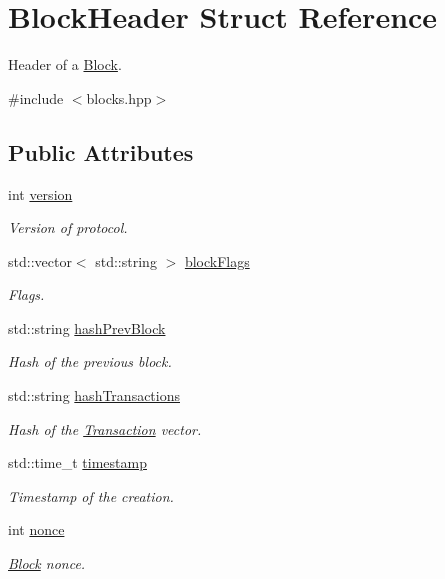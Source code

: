 \hypertarget{structBlockHeader}{}\section{Block\+Header Struct Reference}
\label{structBlockHeader}


Header of a \mbox{\hyperlink{classBlock}{Block}}.  




{\ttfamily \#include $<$blocks.\+hpp$>$}

\subsection*{Public Attributes}
\begin{DoxyCompactItemize}
\item 
int \mbox{\hyperlink{structBlockHeader_a0df73a2de060f5cabeffb4ae97500c75}{version}}
\begin{DoxyCompactList}\small\item\em Version of protocol. \end{DoxyCompactList}\item 
std\+::vector$<$ std\+::string $>$ \mbox{\hyperlink{structBlockHeader_a9eb012a938c50a78b5d8b903a956100f}{block\+Flags}}
\begin{DoxyCompactList}\small\item\em Flags. \end{DoxyCompactList}\item 
std\+::string \mbox{\hyperlink{structBlockHeader_aa0a410bc9b82a4c6752f7f211418420e}{hash\+Prev\+Block}}
\begin{DoxyCompactList}\small\item\em Hash of the previous block. \end{DoxyCompactList}\item 
std\+::string \mbox{\hyperlink{structBlockHeader_a7d56163301fe0ebbab181fe363d62db5}{hash\+Transactions}}
\begin{DoxyCompactList}\small\item\em Hash of the \mbox{\hyperlink{classTransaction}{Transaction}} vector. \end{DoxyCompactList}\item 
std\+::time\+\_\+t \mbox{\hyperlink{structBlockHeader_a4776495703f378b1af78ac6ad7aaca34}{timestamp}}
\begin{DoxyCompactList}\small\item\em Timestamp of the creation. \end{DoxyCompactList}\item 
int \mbox{\hyperlink{structBlockHeader_ad6a79d57f2ca6045c2940ce4af58f879}{nonce}}
\begin{DoxyCompactList}\small\item\em \mbox{\hyperlink{classBlock}{Block}} nonce. \end{DoxyCompactList}\end{DoxyCompactItemize}



